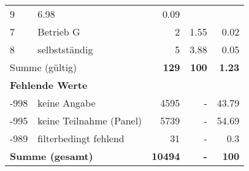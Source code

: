 \begin{longtable}{lXrrr}
       \num{9} &
       \num[round-mode=places,round-precision=2]{6,98} &
         \num[round-mode=places,round-precision=2]{0,09} \\

     7 &
     \multicolumn{1}{X}{ Betrieb G   } &


       \num{2} &
       \num[round-mode=places,round-precision=2]{1,55} &
         \num[round-mode=places,round-precision=2]{0,02} \\

     8 &
     \multicolumn{1}{X}{ selbstständig   } &


       \num{5} &
       \num[round-mode=places,round-precision=2]{3,88} &
         \num[round-mode=places,round-precision=2]{0,05} \\
     \midrule
     \multicolumn{2}{l}{Summe (gültig)} &
       \textbf{\num{129}} &
     \textbf{100} &
       \textbf{\num[round-mode=places,round-precision=2]{1,23}} \\
     \multicolumn{5}{l}{\textbf{Fehlende Werte}}\\
       -998 &
       keine Angabe &
         \num{4595} &
        - &
         \num[round-mode=places,round-precision=2]{43,79} \\
       -995 &
       keine Teilnahme (Panel) &
         \num{5739} &
        - &
         \num[round-mode=places,round-precision=2]{54,69} \\
       -989 &
       filterbedingt fehlend &
         \num{31} &
        - &
         \num[round-mode=places,round-precision=2]{0,3} \\
     \midrule
     \multicolumn{2}{l}{\textbf{Summe (gesamt)}} &
          \textbf{\num{10494}} &
        \textbf{-} &
        \textbf{100} \\
     \bottomrule
     \end{longtable}
     
